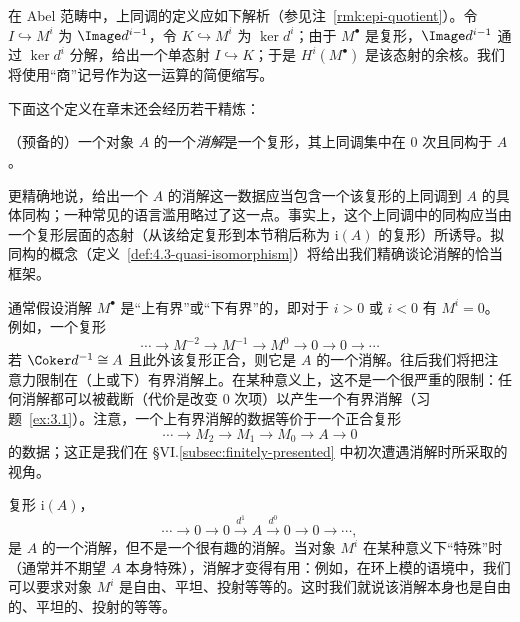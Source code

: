 \begin{remark}
\label{rmk:3.1-cohomology}
在 Abel 范畴中，上同调的定义应如下解析（参见注~\ref{rmk:epi-quotient}）。令 $I\hookrightarrow M^i$ 为 $\Image d^{i-1}$，令 $K\hookrightarrow M^i$ 为 $\ker d^i$；由于 $M^\bullet$ 是复形，$\Image d^{i-1}$ 通过 $\ker d^i$ 分解，给出一个单态射 $I\hookrightarrow K$；于是 $H^i(M^\bullet)$ 是该态射的余核。我们将使用“商”记号作为这一运算的简便缩写。
\end{remark}

下面这个定义在章末还会经历若干精炼：

\begin{definition}
\label{def:3.2-resolution}
（预备的）一个对象 $A$ 的一个\emph{消解}是一个复形，其上同调集中在 $0$ 次且同构于 $A$。
\end{definition}

更精确地说，给出一个 $A$ 的消解这一数据应当包含一个该复形的上同调到 $A$ 的具体同构；一种常见的语言滥用略过了这一点。事实上，这个上同调中的同构应当由一个复形层面的态射（从该给定复形到本节稍后称为 $\mathrm{i}(A)$ 的复形）所诱导。拟同构的概念（定义~\ref{def:4.3-quasi-isomorphism}）将给出我们精确谈论消解的恰当框架。

通常假设消解 $M^\bullet$ 是“上有界”或“下有界”的，即对于 $i>0$ 或 $i<0$ 有 $M^i=0$。例如，一个复形
\[
\cdots \longrightarrow M^{-2} \longrightarrow M^{-1} \longrightarrow M^0 \longrightarrow 0 \longrightarrow 0 \longrightarrow \cdots
\]
若 $\Coker d^{-1}\cong A$ 且此外该复形正合，则它是 $A$ 的一个消解。往后我们将把注意力限制在（上或下）有界消解上。在某种意义上，这不是一个很严重的限制：任何消解都可以被截断（代价是改变 $0$ 次项）以产生一个有界消解（习题~\ref{ex:3.1}）。注意，一个上有界消解的数据等价于一个正合复形
\[
\cdots \longrightarrow M_2 \longrightarrow M_1 \longrightarrow M_0 \longrightarrow A \longrightarrow 0
\]
的数据；这正是我们在 §VI.\ref{subsec:finitely-presented} 中初次遭遇消解时所采取的视角。

复形 $\mathrm{i}(A)$，
\[
\cdots \longrightarrow 0 \longrightarrow 0 \xrightarrow{d^{1}} A \xrightarrow{d^0} 0 \longrightarrow 0 \longrightarrow \cdots,
\]
是 $A$ 的一个消解，但不是一个很有趣的消解。当对象 $M^i$ 在某种意义下“特殊”时（通常并不期望 $A$ 本身特殊），消解才变得有用：例如，在环上模的语境中，我们可以要求对象 $M^i$ 是自由、平坦、投射等等的。这时我们就说该消解本身也是自由的、平坦的、投射的等等。

